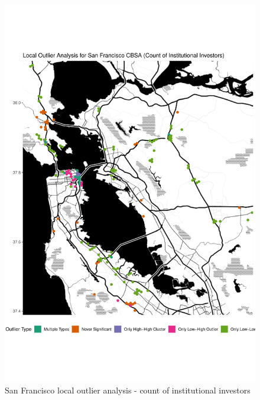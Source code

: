 \begin{figure}
	\centering
	\includegraphics[width=1\linewidth]{Figures/ChapterIV/SF_Count_LO}
	\caption[San Francisco CBSA Local Outlier Analysis - Count of Institutional Investors 1999-2018]{San Francisco local outlier analysis - count of institutional investors}
	\label{fig:SFcountlocaloutliercount}
\end{figure}

